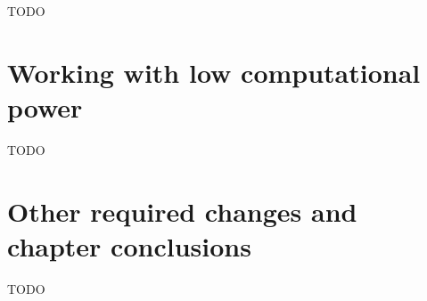 TODO

\section{Working with low computational power}
\label{sec:online_bci_system_low_computational_power}

TODO

\section{Other required changes and chapter conclusions}
\label{sec:online_bci_system_other_changes_conclusion}

TODO
